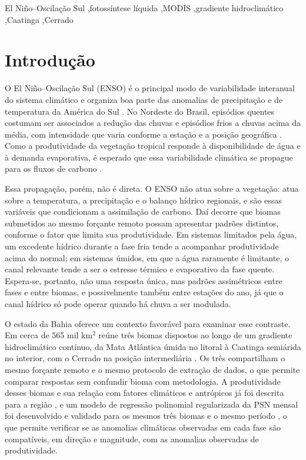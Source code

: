 \documentclass[a4paper,fleqn]{cas-sc}
\begin{document}
\begin{keywords}
El Niño--Oscilação Sul \sep fotossíntese líquida \sep MODIS \sep gradiente hidroclimático \sep Caatinga \sep Cerrado
\end{keywords}

\maketitle

\section{Introdução}

O El Niño--Oscilação Sul (ENSO) é o principal modo de variabilidade interanual do sistema climático e organiza boa parte das anomalias de precipitação e de temperatura da América do Sul \citep{ropelewski1987, trenberth1997, grimm2003, grimm2009, cai2020}. No Nordeste do Brasil, episódios quentes costumam ser associados a redução das chuvas e episódios frios a chuvas acima da média, com intensidade que varia conforme a estação e a posição geográfica \citep{kayano2007, marengo2018}. Como a produtividade da vegetação tropical responde à disponibilidade de água e à demanda evaporativa, é esperado que essa variabilidade climática se propague para os fluxos de carbono \citep{zhao2010, nemani2003}.

Essa propagação, porém, não é direta. O ENSO não atua sobre a vegetação: atua sobre a temperatura, a precipitação e o balanço hídrico regionais, e são essas variáveis que condicionam a assimilação de carbono. Daí decorre que biomas submetidos ao mesmo forçante remoto possam apresentar padrões distintos, conforme o fator que limita sua produtividade. Em sistemas limitados pela água, um excedente hídrico durante a fase fria tende a acompanhar produtividade acima do normal; em sistemas úmidos, em que a água raramente é limitante, o canal relevante tende a ser o estresse térmico e evaporativo da fase quente. Espera-se, portanto, não uma resposta única, mas padrões assimétricos entre fases e entre biomas, e possivelmente também entre estações do ano, já que o canal hídrico só pode operar quando há chuva a ser modulada.

O estado da Bahia oferece um contexto favorável para examinar esse contraste. Em cerca de 565 mil km$^2$ reúne três biomas dispostos ao longo de um gradiente hidroclimático contínuo, da Mata Atlântica úmida no litoral à Caatinga semiárida no interior, com o Cerrado na posição intermediária \citep{ibge2019, alvares2013}. Os três compartilham o mesmo forçante remoto e o mesmo protocolo de extração de dados, o que permite comparar respostas sem confundir bioma com metodologia. A produtividade desses biomas e sua relação com fatores climáticos e antrópicos já foi descrita para a região \citep{benfica2022, benfica2023}, e um modelo de regressão polinomial regularizada da PSN mensal foi desenvolvido e validado para os mesmos três biomas e o mesmo período \citep{oliveira2026}, o que permite verificar se as anomalias climáticas observadas em cada fase são compatíveis, em direção e magnitude, com as anomalias observadas de produtividade.
\end{document}

